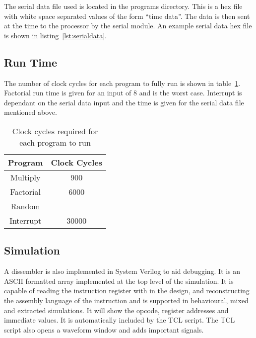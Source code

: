 The serial data file used is located in the programs directory. 
This is a hex file with white space separated values of the form ``time data''. 
The data is then sent at the time to the processor by the serial module. 
An example serial data hex file is shown in listing~\ref{lst:serialdata}.







\subsection{Run Time}
The number of clock cycles for each program to fully run is shown in table~\ref{tab:runtimes}. 
Factorial run time is given for an input of 8 and is the worst case. 
Interrupt is dependant on the serial data input and the time is given for the serial data file mentioned above.

\begin{table}
\centering
\caption{Clock cycles required for each program to run}
\label{tab:runtimes}
\begin{tabular}{|c|c|}
Program & Clock Cycles \\ \hline
Multiply	& 900	\\
Factorial	& 6000	\\
Random		& 	\\
Interrupt	& 30000	\\ \hline
\end{tabular}
\end{table}

\subsection{Simulation}

A dissembler is also implemented in System Verilog to aid debugging.
It is an ASCII formatted array implemented at the top level of the simulation. 
It is capable of reading the instruction register with in the design, and reconstructing the assembly language of the instruction and is supported in behavioural, mixed and extracted simulations.
It will show the opcode, register addresses and immediate values.
It is automatically included by the TCL script.
The TCL script also opens a waveform window and adds important signals.


